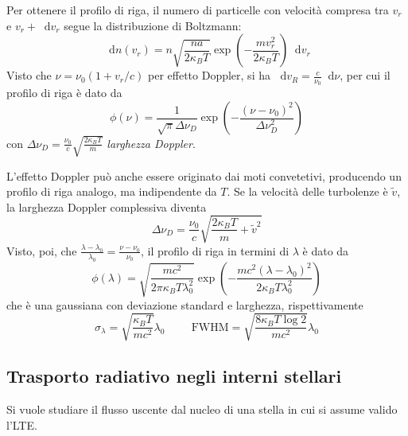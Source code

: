 \documentclass[11pt, a4paper]{scrartcl}
\theoremstyle{style}
\theoremstyle{style1}
\newcommand{\dd}{\mathop{}\!\mathrm{d}}
\numberwithin{equation}{subsection}
\begin{document}
\begin{itemize}
		Per ottenere il profilo di riga, il numero di particelle con velocit\`a compresa tra $v_r$ e $v_r + \dd v_r$ segue la distribuzione di Boltzmann:
		\[
		\dd n(v_r) = n \sqrt{\frac{na}{2\kappa _BT }} \exp \left(- \frac{mv_r^2}{2 \kappa _B T}\right) \dd v_r
		\] 
		Visto che $\nu = \nu _0 (1 + v_r / c)$ per effetto Doppler, si ha $\dd v_R = \frac{c}{\nu _0}\dd \nu $, per cui il profilo di riga \`e dato da 
		\[
		\phi (\nu ) = \frac{1}{\sqrt{\pi} \Delta \nu _D } \exp \left(- \frac{(\nu -\nu _0)^2}{\Delta \nu _D^2}\right) 
		\] 
		con $\Delta \nu _D = \frac{\nu _0}{c}\sqrt{\frac{2\kappa _B T }{m}} $ \textit{larghezza Doppler}.

		L'effetto Doppler pu\`o anche essere originato dai moti convetetivi, producendo un profilo di riga analogo, ma indipendente da $T$.
		Se la velocit\`a delle turbolenze \`e $\tilde{v}$, la larghezza Doppler complessiva diventa
		\[
		\Delta \nu _D = \frac{\nu _0}{c} \sqrt{\frac{2 \kappa _ B T }{m } + \tilde{v}^2} 
		\] 
		Visto, poi, che $\frac{\lambda - \lambda _0}{\lambda _0} = \frac{\nu  - \nu _0}{\nu _0}$, il profilo di riga in termini di $\lambda $ \`e dato da 
		\[
		\phi (\lambda  ) = \sqrt{\frac{mc^2}{2 \pi \kappa _ B T \lambda _0^2}}  \exp \left(- \frac{mc^2 (\lambda -\lambda _0)^2}{2 \kappa _B T \lambda _0^2}\right) 
		\] 
		che \`e una gaussiana con deviazione standard e larghezza, rispettivamente
		\[
		\sigma _\lambda = \sqrt{\frac{\kappa _B T }{mc^2}} \lambda _0 \hspace{1cm} \text{FWHM} = \sqrt{\frac{8 \kappa _B T \log 2}{mc^2}} \lambda _0
		\] 
\end{itemize}
\subsection{Trasporto radiativo negli interni stellari}
Si vuole studiare il flusso uscente dal nucleo di una stella in cui si assume valido l'LTE.
\end{document}
